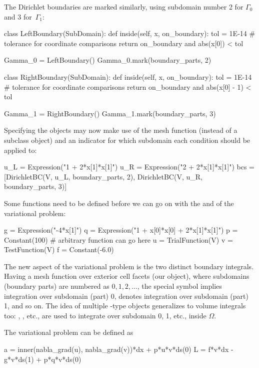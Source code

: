 The Dirichlet boundaries are marked similarly, using subdomain number
2 for $\Gamma_0$ and 3 for~$\Gamma_1$:
\begin{python}
class LeftBoundary(SubDomain):
    def inside(self, x, on_boundary):
        tol = 1E-14   # tolerance for coordinate comparisons
        return on_boundary and abs(x[0]) < tol

Gamma_0 = LeftBoundary()
Gamma_0.mark(boundary_parts, 2)

class RightBoundary(SubDomain):
    def inside(self, x, on_boundary):
        tol = 1E-14   # tolerance for coordinate comparisons
        return on_boundary and abs(x[0] - 1) < tol

Gamma_1 = RightBoundary()
Gamma_1.mark(boundary_parts, 3)
\end{python}
Specifying the  objects may now make use of the mesh
function (instead of a  subclass object) and an indicator
for which subdomain each condition should be applied to:
\begin{python}
u_L = Expression("1 + 2*x[1]*x[1]")
u_R = Expression("2 + 2*x[1]*x[1]")
bcs = [DirichletBC(V, u_L, boundary_parts, 2),
       DirichletBC(V, u_R, boundary_parts, 3)]
\end{python}


Some functions need to be defined before we can go on with the 
and  of the variational problem:
\begin{python}
g = Expression("-4*x[1]")
q = Expression("1 + x[0]*x[0] + 2*x[1]*x[1]")
p = Constant(100)  # arbitrary function can go here
u = TrialFunction(V)
v = TestFunction(V)
f = Constant(-6.0)
\end{python}

The new aspect of the variational problem is the two distinct boundary
integrals.  Having a mesh function over exterior cell facets (our
 object), where subdomains (boundary parts) are
numbered as $0,1,2,\ldots$, the special symbol  implies
integration over subdomain (part) 0,  denotes integration
over subdomain (part) 1, and so on.  The idea of multiple -type
objects generalizes to volume integrals too: , ,
etc., are used to integrate over subdomain 0, 1, etc., inside $\Omega$.

The variational problem can be defined as
\begin{python}
a = inner(nabla_grad(u), nabla_grad(v))*dx + p*u*v*ds(0)
L = f*v*dx - g*v*ds(1) + p*q*v*ds(0)
\end{python}

